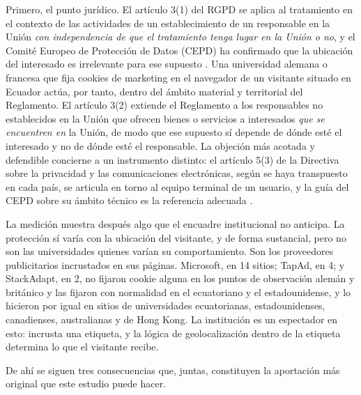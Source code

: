 \documentclass[pdflatex,sn-basic,Numbered,iicol]{sn-jnl}
\theoremstyle{thmstyleone}
\theoremstyle{thmstyletwo}
\theoremstyle{thmstylethree}
\begin{document}
Primero, el punto jur\'idico. El art\'iculo 3(1) del RGPD se aplica al tratamiento en el contexto de las actividades de un establecimiento de un responsable en la Uni\'on \emph{con independencia de que el tratamiento tenga lugar en la Uni\'on o no}, y el Comit\'e Europeo de Protecci\'on de Datos (CEPD) ha confirmado que la ubicaci\'on del interesado es irrelevante para ese supuesto \citep{gdpr2016,edpb2019territorial}. Una universidad alemana o francesa que fija cookies de marketing en el navegador de un visitante situado en Ecuador act\'ua, por tanto, dentro del \'ambito material y territorial del Reglamento. El art\'iculo 3(2) extiende el Reglamento a los responsables no establecidos en la Uni\'on que ofrecen bienes o servicios a interesados \emph{que se encuentren en} la Uni\'on, de modo que ese supuesto s\'i depende de d\'onde est\'e el interesado y no de d\'onde est\'e el responsable. La objeci\'on m\'as acotada y defendible concierne a un instrumento distinto: el art\'iculo 5(3) de la Directiva sobre la privacidad y las comunicaciones electr\'onicas, seg\'un se haya transpuesto en cada pa\'is, se articula en torno al equipo terminal de un usuario, y la gu\'ia del CEPD sobre su \'ambito t\'ecnico es la referencia adecuada \citep{eprivacy2002,edpb2024eprivacy}.

La medici\'on muestra despu\'es algo que el encuadre institucional no anticipa. La protecci\'on s\'i var\'ia con la ubicaci\'on del visitante, y de forma sustancial, pero no son las universidades quienes var\'ian su comportamiento. Son los proveedores publicitarios incrustados en sus p\'aginas. Microsoft, en 14 sitios; TapAd, en 4; y StackAdapt, en 2, no fijaron cookie alguna en los puntos de observaci\'on alem\'an y brit\'anico y las fijaron con normalidad en el ecuatoriano y el estadounidense, y lo hicieron por igual en sitios de universidades ecuatorianas, estadounidenses, canadienses, australianas y de Hong Kong. La instituci\'on es un espectador en esto: incrusta una etiqueta, y la l\'ogica de geolocalizaci\'on dentro de la etiqueta determina lo que el visitante recibe.

De ah\'i se siguen tres consecuencias que, juntas, constituyen la aportaci\'on m\'as original que este estudio puede hacer.
\end{document}
